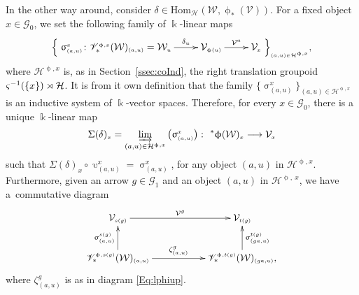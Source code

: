 \documentclass[pdftex]{sigma}
\numberwithin{equation}{section}
\renewcommand{\hom}[3]{\mathrm{Hom}_{\Sscript{#1}}\left(#2, #3\right)}
\newcommand{\Go}{\cG_{\Sscript{0}}}
\newcommand{\Ga}{\cG_{\Sscript{1}}}
\newcommand{\Vx}{\cV_{\Sscript{x}}}
\newcommand{\Wu}{\cW_{\Sscript{u}}}
\newcommand{\Vg}{\cV^{\Sscript{g}}}
\newcommand{\vV}{\mathscr{V}}
\newcommand{\cG}{{\mathcal G}}
\newcommand{\cH}{{\mathcal H}}
\newcommand{\cV}{{\mathcal V}}
\newcommand{\cW}{{\mathcal W}}
\newcommand{\Sscript}[1]{\scriptscriptstyle{#1}}
\newcommand{\injlimit}[2]{\varinjlim_{#1}\left({#2}\right)}
\begin{document}
In the other way around, consider $\delta \in \hom{\cH}{\cW}{\upphi_{*}(\cV)}$. For a fixed object $x \in \Go$, we set the following family of $\Bbbk$-linear maps
\begin{gather}\label{Eq:S}
\Big\{ \xymatrix{ \upsigma^{\Sscript{x}}_{\Sscript{(a, u)}}\colon \vV^{\Sscript{\upphi, x}}_*(\cW)_{\Sscript{(a, u)}} = \Wu
\ar@{->}^-{\delta_u}[r] & \cV_{\Sscript{\upphi(u)}}
\ar@{->}^-{\cV^{\Sscript{a}}}[r] & \Vx } \Big\}_{\Sscript{(a,u) \in \cH^{\Sscript{\upphi, x}}}},
\end{gather}
where $\cH^{\Sscript{\upphi, x}}$ is, as in Section~\ref{ssec:coInd}, the right translation groupoid $\varsigma^{-1}(\{x\})\rJoin \cH$. It is from it own definition that the family $\big\{ \upsigma^{\Sscript{x}}_{\Sscript{(a,
u)}}\big\}_{\Sscript{(a, u) \in \cH^{\Sscript{\upphi, x}}}}$ is an inductive system of $\Bbbk$-vector spaces. Therefore, for every $x \in \Go$, there is a unique $\Bbbk$-linear map
\begin{gather}\label{Eq:SI}
\Sigma(\delta)_{\Sscript{x}} = \injlimit{(a, u) \in \cH^{\Sscript{\upphi,x}}}{\upsigma^{\Sscript{x}}_{\Sscript{(a, u)}}} \colon \
{}^*\upphi(\cW)_{\Sscript{x}} \longrightarrow \Vx
\end{gather}
such that $\Sigma(\delta)_{\Sscript{x}} \circ \upupsilon^{\Sscript{x}}_{\Sscript{(a, u)}} = \upsigma^{\Sscript{x}}_{\Sscript{(a, u)}}$, for any object $(a,u)$ in $\cH^{\Sscript{\upphi,x}}$. Furthermore, given an arrow $g \in
\Ga$ and an object $(a,u)$ in $\cH^{\Sscript{\upphi,\ x}}$, we have a~commutative diagram
\begin{gather}\label{Eq:SII}
\xymatrix@R=25pt{ \cV_{\Sscript{s(g)}} \ar@{->}^-{\Vg}[rr] & &
\cV_{\Sscript{t(g)}} \\ \vV^{\Sscript{\upphi,
s(g)}}_*(\cW)_{\Sscript{(a, u)}}
\ar@{->}^-{\upsigma^{\Sscript{s(g)}}_{\Sscript{(a, u)}}}[u]
\ar@{->}^-{\zeta^g_{(a, u)}}[rr] & &
\ar@{->}_-{\upsigma^{\Sscript{t(g)}}_{\Sscript{(ga, u)}}}[u]
\vV^{\Sscript{\upphi, t(g)}}_*(\cW)_{\Sscript{(ga, u)}}, }
\end{gather}
where $\zeta^g_{(a, u)}$ is as in diagram \eqref{Eq:lphiup}.
\end{document}

